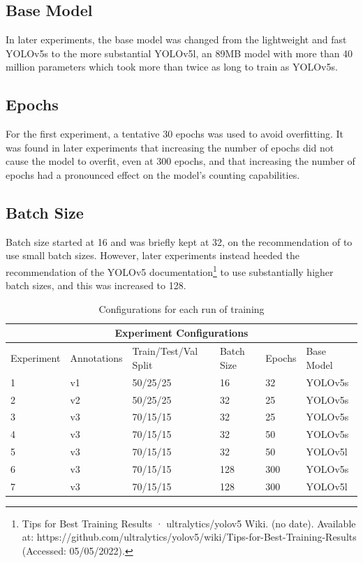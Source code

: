 \subsection{Base Model}
In later experiments, the base model was changed from the lightweight and fast YOLOv5s to the more substantial YOLOv5l, an 89MB model with more than 40 million parameters which took more than twice as long to train as YOLOv5s.

\subsection{Epochs}
For the first experiment, a tentative 30 epochs was used to avoid overfitting. It was found in later experiments that increasing the number of epochs did not cause the model to overfit, even at 300 epochs, and that increasing the number of epochs had a pronounced effect on the model's counting capabilities.

\subsection{Batch Size}
Batch size started at 16 and was briefly kept at 32, on the recommendation of \cite{DBLP:journals/corr/abs-1804-07612} to use small batch sizes. However, later experiments instead heeded the recommendation of the YOLOv5 documentation\footnote{Tips for Best Training Results · ultralytics/yolov5 Wiki. (no date). Available at: https://github.com/ultralytics/yolov5/wiki/Tips-for-Best-Training-Results (Accessed: 05/05/2022).} to use substantially higher batch sizes, and this was increased to 128.

\begin{table}
\centering
\begin{tabular}{ |l||l|l|l|l|l|}
\hline
\multicolumn{6}{|c|}{Experiment Configurations} \\
\hline
Experiment & Annotations & Train/Test/Val Split & Batch Size & Epochs & Base Model\\
\hline
1 & v1 & 50/25/25 & 16 & 32 & YOLOv5s\\ 
 2 & v2 & 50/25/25 & 32 & 25 & YOLOv5s\\
 3 & v3 & 70/15/15 & 32 & 25 & YOLOv5s\\
 4 & v3 & 70/15/15 & 32 & 50 & YOLOv5s\\
 5 & v3 & 70/15/15 & 32 & 50 & YOLOv5l\\
 6 & v3 & 70/15/15 & 128 & 300 & YOLOv5s\\ 
 7 & v3 & 70/15/15 & 128 & 300 & YOLOv5l\\
\hline
\end{tabular}
\caption{Configurations for each run of training}
\label{configs}
\end{table}

